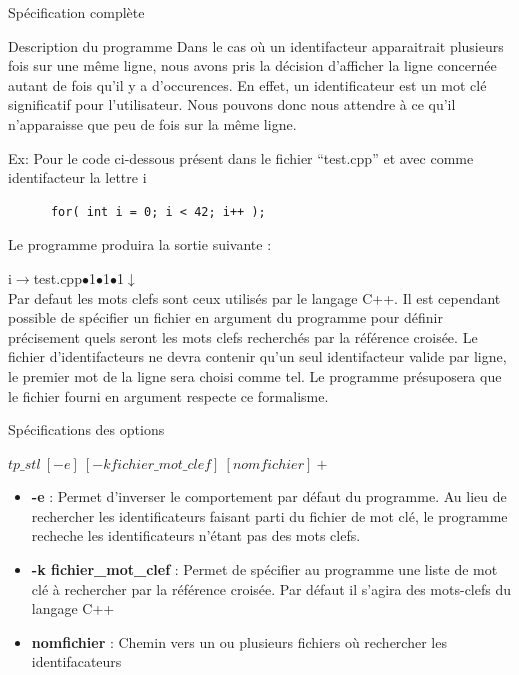 \documentclass{article}
\begin{document}
\begin{section}{Spécification complète}
\begin{subsection}{Description du programme}
    Dans le cas où un identifacteur apparaitrait plusieurs fois sur une même ligne, nous avons pris la décision d'afficher
    la ligne concernée autant de fois qu'il y a d'occurences. En effet, un identificateur est un mot clé significatif pour l'utilisateur.
    Nous pouvons donc nous attendre à ce qu'il n'apparaisse que peu de fois sur la même ligne.
    
    Ex: Pour le code ci-dessous présent dans le fichier ``test.cpp'' et avec comme identifacteur la lettre i 
    
    \begin{verbatim}
      for( int i = 0; i < 42; i++ );
    \end{verbatim}
    Le programme produira la sortie suivante : 

    i$\xrightarrow{}$test.cpp$\bullet$1$\bullet$1$\bullet$1$\downarrow$ \\
    
    Par defaut les mots clefs sont ceux utilisés par le langage C++. Il est cependant possible de spécifier
    un fichier en argument du programme pour définir précisement quels seront les mots clefs recherchés par la référence
    croisée. Le fichier d'identifacteurs ne devra contenir qu'un seul identifacteur valide par ligne, le premier mot de la ligne sera choisi comme tel. Le programme présuposera que
    le fichier fourni en argument respecte ce formalisme.
    
    
  \end{subsection}

  
  \begin{subsection}{Spécifications des options}
    \begin{center}
      \textbf{$tp\_stl\ [-e]\ [-k fichier\_mot\_clef]\ [nomfichier]+$}
    \end{center}

    \begin{itemize}
      \item[] \textbf{-e} : Permet d'inverser le comportement par défaut du programme.
			    Au lieu de rechercher les identificateurs faisant parti du fichier de mot clé, le programme recheche
			    les identificateurs n'étant pas des mots clefs.

      
      \item[] \textbf{-k fichier\_mot\_clef} : Permet de spécifier au programme une liste de mot clé à rechercher par la référence croisée.
					       Par défaut il s'agira des mots-clefs du langage C++ 

      \item[] \textbf{nomfichier} : Chemin vers un ou plusieurs fichiers où rechercher les identifacateurs
    \end{itemize}

  \end{subsection}

\end{section}
\end{document}
